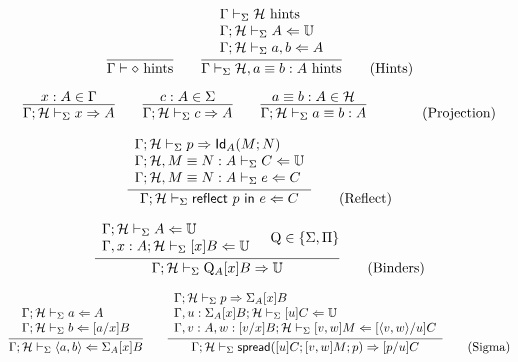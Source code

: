 \documentclass{amsart}
\begin{document}
\begin{equation}
  \infer{\Gamma\vdash \emp\hints}{}
  \qquad
  \infer{
    \Gamma\vdash_\Sigma \mathcal{H}, a\equiv b:A\hints
  }{
    \begin{array}{l}
      \Gamma\vdash_\Sigma \mathcal{H}\hints\\
      \Gamma;\mathcal{H}\vdash_\Sigma A\checks\uni\\
      \Gamma;\mathcal{H}\vdash_\Sigma a,b\checks A
    \end{array}
  }
  \tag{Hints}
\end{equation}

\begin{equation}
  \infer{
    \Gamma;\mathcal{H}\vdash_\Sigma x\infers A
  }{
    x:A\in\Gamma
  }
  \qquad
  \infer{
    \Gamma;\mathcal{H}\vdash_\Sigma c\infers A
  }{
    c:A\in\Sigma
  }
  \qquad
  \infer{
    \Gamma;\mathcal{H}\vdash_\Sigma a\equiv b:A
  }{
    a\equiv b:A \in \mathcal{H}
  }
  \qquad
  \tag{Projection}
\end{equation}

\begin{equation}
  \infer{
    \Gamma;\mathcal{H}\vdash_\Sigma \mathsf{reflect}\ p\ \mathsf{in}\ e \checks C
  }{
    \begin{array}{l}
      \Gamma;\mathcal{H}\vdash_\Sigma p \infers \mathsf{Id}_A(M;N)\\
      \Gamma;\mathcal{H}, M\equiv N:A\vdash_\Sigma C\checks\uni\\
      \Gamma;\mathcal{H}, M\equiv N:A\vdash_\Sigma e \checks C
    \end{array}
  }
  \tag{Reflect}
\end{equation}

\begin{equation}
  \infer{
    \Gamma;\mathcal{H}\vdash_\Sigma\mathrm{Q}_A[x]B\infers\uni
  }{
    \begin{array}{l}
      \Gamma;\mathcal{H}\vdash_\Sigma A \checks\uni\\
      \Gamma,x:A;\mathcal{H}\vdash_\Sigma [x]B\checks\uni
    \end{array} &
    \mathrm{Q} \in \{ \Sigma, \Pi \}
  }
  \tag{Binders}
\end{equation}

\begin{equation}
  \infer{
    \Gamma;\mathcal{H}\vdash_\Sigma \langle a,b\rangle \checks \Sigma_A[x]B
  }{
    \begin{array}{l}
      \Gamma;\mathcal{H}\vdash_\Sigma a\checks A\\
      \Gamma;\mathcal{H}\vdash_\Sigma b\checks [a/x]B
    \end{array}
  }
  \qquad
  \infer{
    \Gamma;\mathcal{H}\vdash_\Sigma \mathsf{spread}([u]C; [v,w]M; p)\infers [p/u]C
  }{
    \begin{array}{l}
      \Gamma;\mathcal{H}\vdash_\Sigma p\infers \Sigma_A[x]B\\
      \Gamma,u:\Sigma_A[x]B;\mathcal{H}\vdash_\Sigma [u]C\checks\uni\\
      \Gamma,v:A,w:[v/x]B;\mathcal{H}\vdash_\Sigma [v,w]M\checks[\langle v,w\rangle/u]C
    \end{array}
  }
  \tag{Sigma}
\end{equation}
\end{document}
